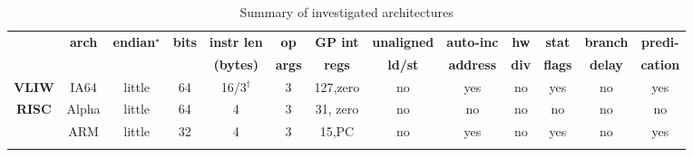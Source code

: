 \begin{sidewaystable}[tbp]
\caption{Summary of investigated architectures}
\label{table:archtable}
\begin{sf}
\begin{footnotesize}
\begin{center}
\begin{tabular}{|c|c||c|c|c|c|c|c|c|c|c|c|c|}
\hline
\T \multirow{2}{*}{\bf Type} &
\multirow{2}{*}{\bf arch} &
\multirow{2}{*}{\bf endian$^{\star}$} & 
\multirow{2}{*}{\bf bits} & 
{\bf instr len} & 
{\bf op} & 
{\bf GP int} & 
{\bf unaligned} & 
{\bf auto-inc} & 
{\bf hw}  &
{\bf stat} &
{\bf branch} & 
{\bf predi-}\\

        & %
        & %
        & %
        & %
{\bf (bytes)} & %
{\bf args}    & %
{\bf regs}    & %
{\bf ld/st}   & %
{\bf address} & %
{\bf div}     & %
{\bf flags}   & %
{\bf delay}   & %
{\bf cation}\\  %

\hline\hline


\multirow{1}{*}{\bf VLIW} &
IA64             &  %
little           &  %
64               &  %
16/3$^{\dagger}$ &  %
3                &  %
127,zero         &  %
no               &  %
yes              &  %
no               &  %
yes              &  %
no               &  %
yes                 %
\\
\hline
\hline


\multirow{10}{*}{\bf RISC} &
Alpha            & %
little           & %
64               & %
4                & %
3                & %
31, zero         & %
no               & %
no               & %
no               & %
no               & %
no               & %
no                 %
\\
\cline{2-13}

                 & %
ARM              & %
little           & %
32               & %
4                & %
3                & %
15,PC            & %
no               & %
yes              & %
no               & %
yes              & %
no               & %
yes                %
\\
\cline{2-13}


\end{tabular}
\end{center}
\end{footnotesize}
\end{sf}
\end{sidewaystable}
